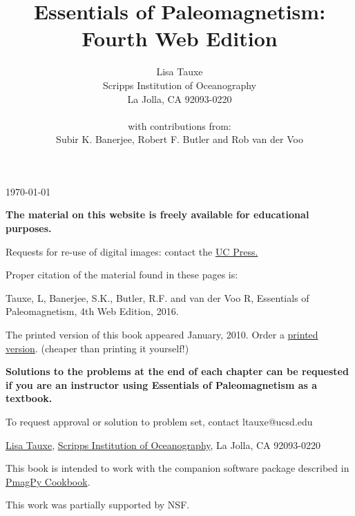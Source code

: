 \documentclass[11pt]{book}
\begin{document}
  \newcommand{\be}{\begin{equation}}%
\newcommand{\ee}{\end{equation}}%

 
 
 \title{Essentials of  Paleomagnetism: Fourth Web Edition}
 \author{Lisa Tauxe\\Scripps Institution of Oceanography\\La Jolla, CA 92093-0220\\ \\
  with contributions from: \\ Subir K. Banerjee, Robert F. Butler and Rob van der Voo}
  \today
 \maketitle
 
{\bf The material on this website is freely available for educational purposes. }

Requests for re-use of digital images: contact the \href{http://http://www.ucpress.edu}{UC Press.}

Proper citation of the material found in these pages is: 

Tauxe, L, Banerjee, S.K., Butler, R.F. and van der Voo R, Essentials of Paleomagnetism, 4th Web Edition, 2016. 

The printed version of this book appeared January, 2010. Order a \href{http://www.ucpress.edu/books/pages/11183.php}{printed version}. (cheaper than printing it yourself!)

{\bf Solutions to the problems at the end of each chapter can be requested if you are an instructor using Essentials of Paleomagnetism as a textbook.}

To request approval or solution to problem set, contact ltauxe@ucsd.edu 

\href{http://magician.ucsd.edu/~ltauxe/}{Lisa Tauxe}, \href{http://scripps.ucsd.edu}{Scripps Institution of Oceanography}, La Jolla, CA 92093-0220

This book is intended to work with the companion software package described in \href{http://earthref.org/PmagPy/cookbook/}{PmagPy Cookbook}.   

This work was partially supported by NSF.
\end{document}
